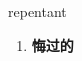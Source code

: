 
\begin{frame}
{\huge repentant}
\begin{center}
\begin{enumerate}\Large
  \item \textbf{悔过的}
\end{enumerate}
\end{center}
\end{frame}
